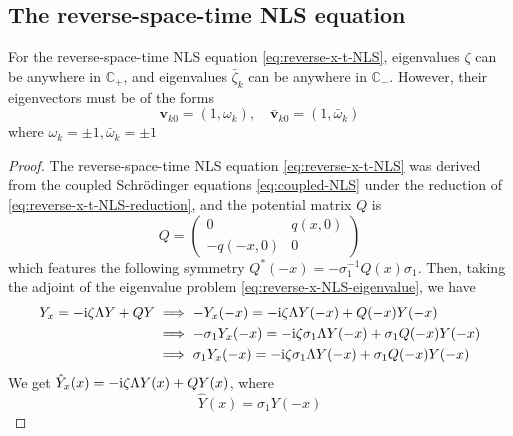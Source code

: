 \subsection{The reverse-space-time NLS equation}
\begin{theorem}
    For the reverse-space-time NLS equation \eqref{eq:reverse-x-t-NLS}, eigenvalues $ \zeta $ can be anywhere in $ \mathbb{C}_{+} $, and eigenvalues $ \bar{\zeta}_{k} $ can be anywhere in $ \mathbb{C}_{-} $. However, their eigenvectors must be of the forms
    \begin{equation}
        \mathbf{v}_{k0} = (1, \omega_{k}), \quad \bar{\mathbf{v}}_{k0} = (1, \bar{\omega}_{k})
    \end{equation}
    where $ \omega_{k} = \pm 1, \bar{\omega}_{k} = \pm 1 $
\end{theorem}
\begin{proof}
    The reverse-space-time NLS equation \eqref{eq:reverse-x-t-NLS} was derived from the coupled Schrödinger equations \eqref{eq:coupled-NLS} under the reduction of \eqref{eq:reverse-x-t-NLS-reduction}, and the potential matrix $ Q $ is
    \begin{equation}
        Q = \begin{pmatrix}
            0 & q(x,0) \\
            -q(-x,0) & 0
        \end{pmatrix}
    \end{equation}
    which features the following symmetry $ Q^{*}(-x) = -\sigma_{1}^{-1}Q(x)\sigma_{1} $. Then, taking the adjoint of the eigenvalue problem \eqref{eq:reverse-x-NLS-eigenvalue}, we have
    \begin{equation}
        \begin{aligned}
        Y_{x} = -\mathrm{i} \zeta \Lambda Y + QY &\implies -Y_{x}(-x) = -\mathrm{i} \zeta \Lambda Y(-x) + Q(-x)Y(-x) \\
        &\implies -\sigma_{1} Y_{x}(-x)= -\mathrm{i} \zeta \sigma_{1}\Lambda Y(-x) + \sigma_{1}Q(-x)Y(-x) \\
        &\implies \sigma_{1}Y_{x}(-x) = -\mathrm{i} \zeta \sigma_{1}\Lambda Y(-x) +\sigma_{1}Q(-x)Y(-x) \\
        \end{aligned}
    \end{equation}
    We get $ \hat{Y}_{x}(x) = -\mathrm{i} \zeta  \Lambda Y(x) + QY(x) $, where
    \begin{equation}
        \hat{Y}(x) = \sigma_{1}Y(-x) \label{eq:reverse-x-t-NLS-eigenvector}
    \end{equation}

\end{proof}
